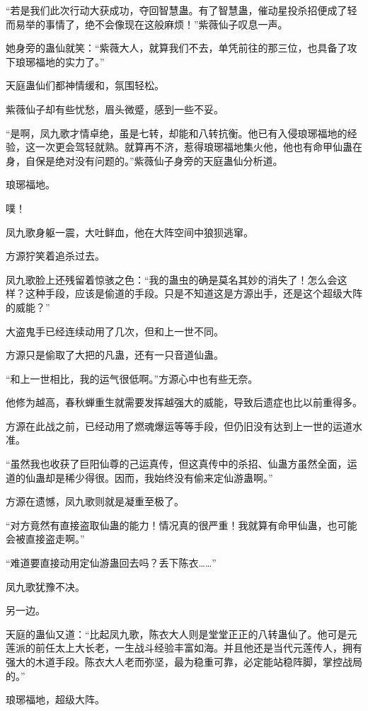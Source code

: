 \begin{this_body}
“若是我们此次行动大获成功，夺回智慧蛊。有了智慧蛊，催动星投杀招便成了轻而易举的事情了，绝不会像现在这般麻烦！”紫薇仙子叹息一声。

她身旁的蛊仙就笑：“紫薇大人，就算我们不去，单凭前往的那三位，也具备了攻下琅琊福地的实力了。”

天庭蛊仙们都神情缓和，氛围轻松。

紫薇仙子却有些忧愁，眉头微蹙，感到一些不妥。

“是啊，凤九歌才情卓绝，虽是七转，却能和八转抗衡。他已有入侵琅琊福地的经验，这一次更会驾轻就熟。就算再不济，惹得琅琊福地集火他，他也有命甲仙蛊在身，自保是绝对没有问题的。”紫薇仙子身旁的天庭蛊仙分析道。

琅琊福地。

噗！

凤九歌身躯一震，大吐鲜血，他在大阵空间中狼狈逃窜。

方源狞笑着追杀过去。

凤九歌脸上还残留着惊骇之色：“我的蛊虫的确是莫名其妙的消失了！怎么会这样？这种手段，应该是偷道的手段。只是不知道这是方源出手，还是这个超级大阵的威能？”

大盗鬼手已经连续动用了几次，但和上一世不同。

方源只是偷取了大把的凡蛊，还有一只音道仙蛊。

“和上一世相比，我的运气很低啊。”方源心中也有些无奈。

他修为越高，春秋蝉重生就需要发挥越强大的威能，导致后遗症也比以前重得多。

方源在此战之前，已经动用了燃魂爆运等等手段，但仍旧没有达到上一世的运道水准。

“虽然我也收获了巨阳仙尊的己运真传，但这真传中的杀招、仙蛊方虽然全面，运道的仙蛊却是稀少得很。因而，我始终没有偷来定仙游蛊啊。”

方源在遗憾，凤九歌则就是凝重至极了。

“对方竟然有直接盗取仙蛊的能力！情况真的很严重！我就算有命甲仙蛊，也可能会被直接盗走啊。”

“难道要直接动用定仙游蛊回去吗？丢下陈衣……”

凤九歌犹豫不决。

另一边。

天庭的蛊仙又道：“比起凤九歌，陈衣大人则是堂堂正正的八转蛊仙了。他可是元莲派的前任太上大长老，一生战斗经验丰富如海。并且他还是当代元莲传人，拥有强大的木道手段。陈衣大人老而弥坚，最为稳重可靠，必定能站稳阵脚，掌控战局的。”

琅琊福地，超级大阵。


\end{this_body}
